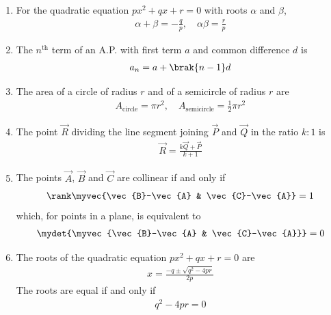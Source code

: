 \begin{enumerate}[label=\thesubsection.\arabic*, ref=\thesubsection.\theenumi]
\begin{align}
	\\
	\implies \norm{\vec{x}}^2 - 2\vec{A}^{\top}\vec{x} + \norm{\vec{A}}^2
	&= \norm{\vec{x}}^2 - 2\vec{B}^{\top}\vec{x} + \norm{\vec{B}}^2
\end{align}
which simplifies to \eqref{eq:EE26BTECH11229-perp-bisector}.
\item For the quadratic equation $px^2 + qx + r = 0$ with roots $\alpha$ and $\beta$,
\begin{align}
	\alpha + \beta = -\frac{q}{p}, \quad \alpha\beta = \frac{r}{p}
	\label{eq:EE26BTECH11229-quad-roots}
\end{align}
\item The $n^{\text{th}}$ term of an A.P. with first term $a$ and common difference $d$ is
\begin{align}
	a_n = a + \brak{n-1}d
	\label{eq:EE26BTECH11229-ap-nth}
\end{align}
\item The area of a circle of radius $r$ and of a semicircle of radius $r$ are
\begin{align}
	A_{\text{circle}} = \pi r^2, \quad A_{\text{semicircle}} = \frac{1}{2}\pi r^2
	\label{eq:EE26BTECH11229-area-circle}
\end{align}
\item The point $\vec{R}$ dividing the line segment joining $\vec{P}$ and $\vec{Q}$ in the ratio $k:1$ is
\begin{align}
	\vec{R} = \frac{k\vec{Q} + \vec{P}}{k+1}
	\label{eq:EE26BTECH11229-section}
\end{align}
\item The points $\vec{A}$, $\vec{B}$ and $\vec{C}$ are collinear if and only if
\begin{align}
	\rank\myvec{\vec{B}-\vec{A} & \vec{C}-\vec{A}} = 1
	\label{eq:EE26BTECH11229-collinear}
\end{align}
which, for points in a plane, is equivalent to
\begin{align}
	\mydet{\myvec{\vec{B}-\vec{A} & \vec{C}-\vec{A}}} = 0
\end{align}
\item The roots of the quadratic equation $px^2 + qx + r = 0$ are
\begin{align}
	x = \frac{-q \pm \sqrt{q^2 - 4pr}}{2p}
	\label{eq:EE26BTECH11229-quad-formula}
\end{align}
The roots are equal if and only if
\begin{align}
	q^2 - 4pr = 0
	\label{eq:EE26BTECH11229-quad-equal}
\end{align}

\end{enumerate}
